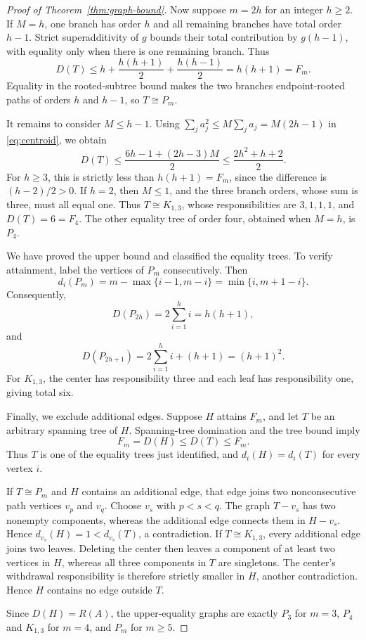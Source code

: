 \documentclass[10pt,a4paper]{amsart}
\begin{document}
\begin{proof}[Proof of Theorem~\ref{thm:graph-bound}]
Now suppose \(m=2h\) for an integer \(h\geq2\). If \(M=h\), one branch has order \(h\)
and all remaining branches have total order \(h-1\). Strict superadditivity of
\(g\) bounds their total contribution by \(g(h-1)\), with equality only when
there is one remaining branch. Thus
\[
 D(T)\leq h+\frac{h(h+1)}2+\frac{h(h-1)}2
 =h(h+1)=F_m.
\]
Equality in the rooted-subtree bound makes the two branches endpoint-rooted
paths of orders \(h\) and \(h-1\), so \(T\cong P_m\).

It remains to consider \(M\leq h-1\). Using
\(\sum_j a_j^2\leq M\sum_j a_j=M(2h-1)\) in
\eqref{eq:centroid}, we obtain
\[
 D(T)
 \leq\frac{6h-1+(2h-3)M}{2}
 \leq\frac{2h^2+h+2}{2}.
\]
For \(h\geq3\), this is strictly less than \(h(h+1)=F_m\), since the
difference is \((h-2)/2>0\). If \(h=2\), then \(M\leq1\), and the three
branch orders, whose sum is three, must all equal one. Thus
\(T\cong K_{1,3}\), whose responsibilities are \(3,1,1,1\), and
\(D(T)=6=F_4\). The other equality tree of order four, obtained when \(M=h\),
is \(P_4\).

We have proved the upper bound and classified the equality trees. To verify
attainment, label the vertices of \(P_m\) consecutively. Then
\[
 d_i(P_m)=m-\max\{i-1,m-i\}=\min\{i,m+1-i\}.
\]
Consequently,
\[
 D(P_{2h})=2\sum_{i=1}^h i=h(h+1),
\]
and
\[
 D(P_{2h+1})=2\sum_{i=1}^h i+(h+1)=(h+1)^2.
\]
For \(K_{1,3}\), the center has responsibility three and each leaf has
responsibility one, giving total six.

Finally, we exclude additional edges. Suppose \(H\) attains \(F_m\), and let
\(T\) be an arbitrary spanning tree of \(H\). Spanning-tree domination and the tree
bound imply
\[
 F_m=D(H)\leq D(T)\leq F_m.
\]
Thus \(T\) is one of the equality trees just identified, and
\(d_i(H)=d_i(T)\) for every vertex \(i\).

If \(T\cong P_m\) and \(H\) contains an additional edge, that edge joins two
nonconsecutive path vertices \(v_p\) and \(v_q\). Choose \(v_s\) with
\(p<s<q\). The graph \(T-v_s\) has two nonempty components, whereas the
additional edge connects them in \(H-v_s\). Hence
\(d_{v_s}(H)=1<d_{v_s}(T)\), a contradiction. If
\(T\cong K_{1,3}\), every additional edge joins two leaves. Deleting the
center then leaves a component of at least two vertices in \(H\), whereas all
three components in \(T\) are singletons. The center's withdrawal responsibility
is therefore strictly smaller in \(H\), another contradiction. Hence \(H\)
contains no
edge outside \(T\).

Since \(D(H)=R(A)\), the upper-equality graphs are exactly \(P_3\) for \(m=3\),
\(P_4\) and \(K_{1,3}\) for \(m=4\), and \(P_m\) for \(m\geq5\).
\end{proof}
\end{document}

